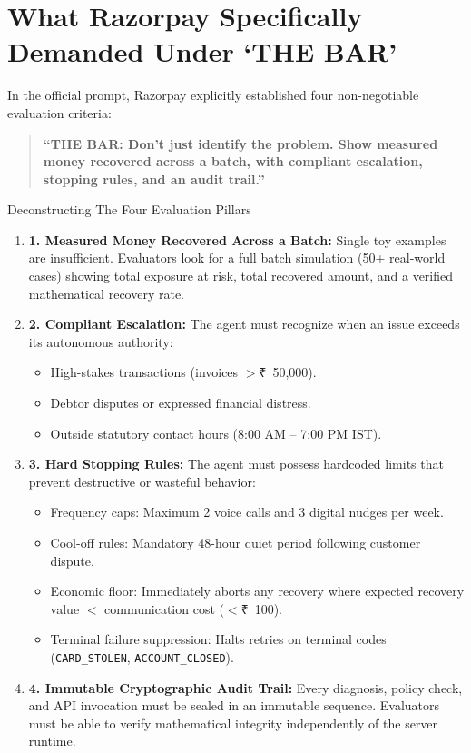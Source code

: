 \documentclass[11pt, a4paper]{article}
\newcommand{\INR}{{\rupeefont ₹}}
\begin{document}
\section{What Razorpay Specifically Demanded Under `THE BAR'}

In the official prompt, Razorpay explicitly established four non-negotiable evaluation criteria:
\begin{quote}
\textbf{``THE BAR: Don't just identify the problem. Show measured money recovered across a batch, with compliant escalation, stopping rules, and an audit trail.''}
\end{quote}

\begin{barbox}{Deconstructing The Four Evaluation Pillars}
\begin{enumerate}[leftmargin=1.5em, itemsep=6pt]
  \item \textbf{1. Measured Money Recovered Across a Batch:}
  Single toy examples are insufficient. Evaluators look for a full batch simulation (50+ real-world cases) showing total exposure at risk, total recovered amount, and a verified mathematical recovery rate.
  
  \item \textbf{2. Compliant Escalation:}
  The agent must recognize when an issue exceeds its autonomous authority:
  \begin{itemize}[leftmargin=1.2em, itemsep=2pt]
    \item High-stakes transactions (invoices $>$\INR~50,000).
    \item Debtor disputes or expressed financial distress.
    \item Outside statutory contact hours (8:00 AM -- 7:00 PM IST).
  \end{itemize}
  
  \item \textbf{3. Hard Stopping Rules:}
  The agent must possess hardcoded limits that prevent destructive or wasteful behavior:
  \begin{itemize}[leftmargin=1.2em, itemsep=2pt]
    \item Frequency caps: Maximum 2 voice calls and 3 digital nudges per week.
    \item Cool-off rules: Mandatory 48-hour quiet period following customer dispute.
    \item Economic floor: Immediately aborts any recovery where expected recovery value $<$ communication cost ($<$\INR~100).
    \item Terminal failure suppression: Halts retries on terminal codes (\texttt{CARD\_STOLEN}, \texttt{ACCOUNT\_CLOSED}).
  \end{itemize}
  
  \item \textbf{4. Immutable Cryptographic Audit Trail:}
  Every diagnosis, policy check, and API invocation must be sealed in an immutable sequence. Evaluators must be able to verify mathematical integrity independently of the server runtime.
\end{enumerate}
\end{barbox}
\end{document}
